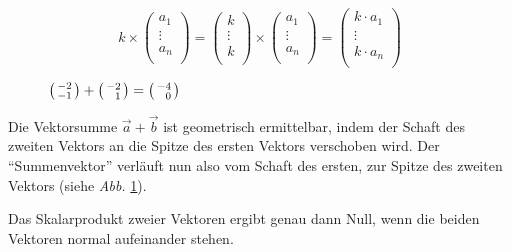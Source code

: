 \documentclass[twocolumn]{article}
\newcommand{\figref}[1]{\emph{Abb.} \ref{#1}}
\newcommand{\smalltwodvector}[2]{\begin{psmallmatrix*}[r]#1 \\ #2 \\\end{psmallmatrix*}}
\begin{document}
%
\begin{equation*}
    k \times \begin{pmatrix}a_1 \\ \vdots \\ a_n \\\end{pmatrix} = \begin{pmatrix}k \\ \vdots \\ k \\\end{pmatrix} \times \begin{pmatrix}a_1 \\ \vdots \\ a_n \\\end{pmatrix} = \begin{pmatrix}k \cdot a_1 \\ \vdots \\ k \cdot a_n \\\end{pmatrix}
\end{equation*}

\begin{figure}[]
    \centering

    \caption{$\smalltwodvector{-2}{-1} + \smalltwodvector{-2}{1} = \smalltwodvector{-4}{0}$}
    \label{fig:vec_addition}
\end{figure}

Die Vektorsumme $\Vec{a} + \Vec{b}$ ist geometrisch ermittelbar, indem der Schaft des zweiten Vektors an die Spitze des ersten Vektors verschoben wird. Der \enquote{Summenvektor} verläuft nun also vom Schaft des ersten, zur Spitze des zweiten Vektors (siehe \figref{fig:vec_addition}).

Das Skalarprodukt zweier Vektoren ergibt genau dann Null, wenn die beiden Vektoren normal aufeinander stehen.
\end{document}
